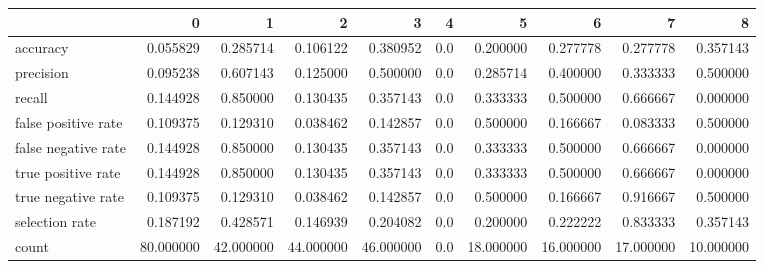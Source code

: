\begin{tabular}{lrrrrrrrrr}
\toprule
{} &          0 &          1 &          2 &          3 &    4 &          5 &          6 &          7 &          8 \\
\midrule
accuracy            &   0.055829 &   0.285714 &   0.106122 &   0.380952 &  0.0 &   0.200000 &   0.277778 &   0.277778 &   0.357143 \\
precision           &   0.095238 &   0.607143 &   0.125000 &   0.500000 &  0.0 &   0.285714 &   0.400000 &   0.333333 &   0.500000 \\
recall              &   0.144928 &   0.850000 &   0.130435 &   0.357143 &  0.0 &   0.333333 &   0.500000 &   0.666667 &   0.000000 \\
false positive rate &   0.109375 &   0.129310 &   0.038462 &   0.142857 &  0.0 &   0.500000 &   0.166667 &   0.083333 &   0.500000 \\
false negative rate &   0.144928 &   0.850000 &   0.130435 &   0.357143 &  0.0 &   0.333333 &   0.500000 &   0.666667 &   0.000000 \\
true positive rate  &   0.144928 &   0.850000 &   0.130435 &   0.357143 &  0.0 &   0.333333 &   0.500000 &   0.666667 &   0.000000 \\
true negative rate  &   0.109375 &   0.129310 &   0.038462 &   0.142857 &  0.0 &   0.500000 &   0.166667 &   0.916667 &   0.500000 \\
selection rate      &   0.187192 &   0.428571 &   0.146939 &   0.204082 &  0.0 &   0.200000 &   0.222222 &   0.833333 &   0.357143 \\
count               &  80.000000 &  42.000000 &  44.000000 &  46.000000 &  0.0 &  18.000000 &  16.000000 &  17.000000 &  10.000000 \\
\bottomrule
\end{tabular}
